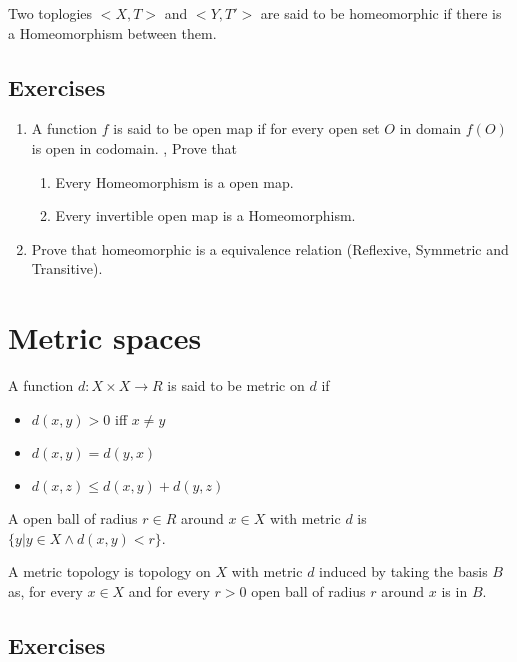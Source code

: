 \documentclass[twosides, openany]{tufte-book}
\begin{document}
Two toplogies $<X, T>$ and $<Y, T'>$ are said to be homeomorphic if there is a Homeomorphism between them.
\section{Exercises}
    \begin{enumerate}
        \item A function $f$ is said to be open map if for every open set $O$ in domain $f(O)$ is open in codomain. , Prove that
        \begin{enumerate}
            \item Every Homeomorphism is a open map.
            \item Every invertible open map is a Homeomorphism.
        \end{enumerate}

        \item Prove that homeomorphic is a equivalence relation (Reflexive, Symmetric and Transitive). 
    \end{enumerate}

\chapter{Metric spaces}
A function $d : X \times X \rightarrow R$ is said to be metric on $d$ if
\begin{itemize}
    \item $d(x, y) > 0$ iff $x \neq y$ 
    \item $d(x, y) = d(y,x)$
    \item $d(x, z) \leq d(x, y) + d(y, z)$
\end{itemize}

A open ball of radius $r \in R$ around $x \in X$ with metric $d$ is $\{y | y \in X \land d(x, y) < r\}$.

A metric topology is topology on $X$ with metric $d$ induced by taking the basis $B$ as, for every $x \in X$ and for every $r > 0$ open ball of radius $r$ around $x$ is in $B$. 

\section{Exercises}
\end{document}
